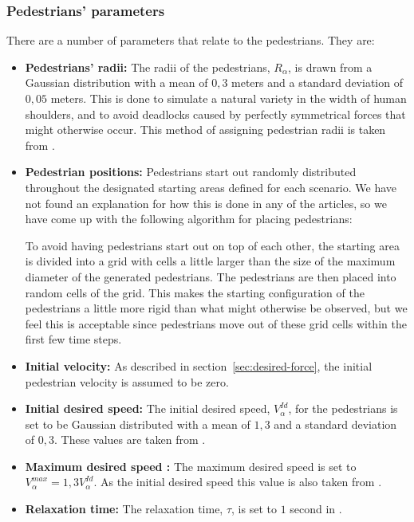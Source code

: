 \subsubsection{Pedestrians' parameters}
\label{sec:init-pedestrians}
There are a number of parameters that relate to the pedestrians. They are:

\begin{itemize}
    \item \textbf{Pedestrians' radii:} The radii of the pedestrians, 
        $R_\alpha$, is drawn from a Gaussian distribution with a mean of $0,3$ 
        meters and a standard deviation of $0,05$ meters. This is done to 
        simulate a natural variety in the width of human shoulders, and to 
        avoid deadlocks caused by perfectly symmetrical forces that might 
        otherwise occur. This method of assigning pedestrian radii is taken 
        from \cite{self-org}.
        
    \item \textbf{Pedestrian positions:} Pedestrians start out randomly 
        distributed throughout the designated starting areas defined for each 
        scenario. We have not found an explanation for how this is done in any 
        of the articles, so we have come up with the following algorithm for 
        placing pedestrians:

        To avoid having pedestrians start out on top of each other, the 
        starting area is divided into a grid with cells a little larger than 
        the size of the maximum diameter of the generated pedestrians. The 
        pedestrians are then placed into random cells of the grid. This makes 
        the starting configuration of the pedestrians a little more rigid than 
        what might otherwise be observed, but we feel this is acceptable since 
        pedestrians move out of these grid cells within the first few time 
        steps.
        
    \item \textbf{Initial velocity:} As described in 
        section~\ref{sec:desired-force}, the initial pedestrian velocity is 
        assumed to be zero.


    \item \textbf{Initial desired speed:} The initial desired speed, 
        $V^{Id}_\alpha$, for the pedestrians is set to be Gaussian 
        distributed with a mean of $1,3$ and a standard deviation of $0,3$.
	These values are taken from \cite{self-org}. 


    \item \textbf{Maximum desired speed :} The maximum desired speed is set to 
        $V_{\alpha}^{max}=1,3V^{Id}_\alpha$.
	As the initial desired speed this value is also taken from \cite{social-force}.
      
        
    \item \textbf{Relaxation time:} The relaxation time, $\tau$, is set to $1$ 
        second in \cite{self-org}. 
\end{itemize}

